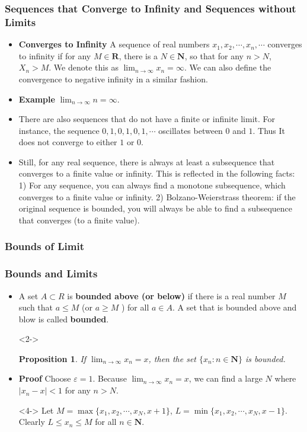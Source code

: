 \documentclass[handout]{beamer}
\newtheorem{Proposition}[theorem]{Proposition}
\begin{document}
\frame
{
  \frametitle{Sequences that Converge to Infinity and Sequences without Limits}

  \begin{itemize}
  \item <1->  \textbf{Converges to Infinity} A sequence of real numbers $x_1,x_2,\cdots,x_n,\cdots $ converges to infinity if for any $M\in\mathbf{R}$, there is a $N\in\mathbf{N}$, so that for any $n>N$, $X_n>M$. We denote this as $\lim_{n\rightarrow\infty} x_n=\infty$. We can also define the convergence to negative infinity in a similar fashion. 
  
      \item<2-> \textbf{Example} $\lim_{n\rightarrow\infty} n= \infty.$

    \item<3-> There are also sequences that do not have a finite or infinite limit. For instance, the sequence $0,1,0,1,0,1,\cdots$ oscillates between $0$ and $1$. Thus It does not converge to either $1$ or $0$. 
 
    \item<4-> Still, for any real sequence, there is always at least a subsequence that converges to a finite value or infinity. This is reflected in the following facts: 1) For any sequence, you can always find a monotone subsequence, which converges to a finite value or infinity. 2) Bolzano-Weierstrass theorem:  if the original sequence is bounded, you will always be able to find a subsequence that converges (to a finite value). 
         
  \end{itemize}
}



\subsubsection{Bounds of Limit}

\frame
{
  \frametitle{Bounds and Limits}

  \begin{itemize}
  \item <1->   A set $A\subset R$ is \textbf{bounded above (or below) } if there is a real number $M$ such that $a\leq M$ (or $a\geq M$ ) for all $a\in A$.  A set that is bounded above and blow is called \textbf{bounded}. 
  
  \item [] <2-> \begin{Proposition} If $\lim_{n\rightarrow\infty} x_n=x$, then the set $\{x_n:n\in \mathbf{N}\}$ is bounded. \end{Proposition} 
    \item<3-> \textbf{Proof} Choose $\varepsilon=1$. Because $\lim_{n\rightarrow\infty} x_n=x$, we can find a large $N$ where $|x_n-x|< 1$ for any $n>N$.
    \item[]<4-> Let $M=\max \{x_1,x_2,\cdots, x_N, x+1\}$, $L=\min \{x_1,x_2,\cdots, x_N, x-1\}$. Clearly $L\leq x_n\leq M$ for all $n\in \mathbf{N}$.
    

         
  \end{itemize}
}
\end{document}
